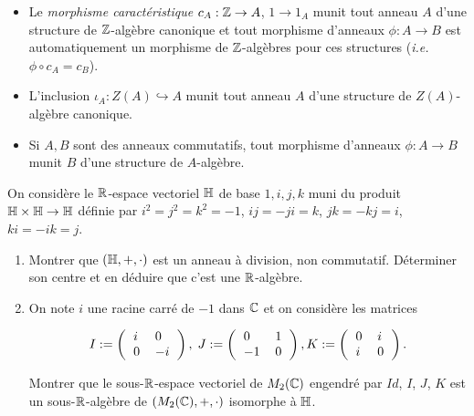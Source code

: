 \begin{exemples}
\begin{itemize}[leftmargin=* ,parsep=0cm,itemsep=0cm,topsep=0cm]
    \item Le \emph{morphisme caractéristique} $c_A:\mathbb{Z}\rightarrow A$, $1\rightarrow 1_A$ munit tout
        anneau $A$ d'une structure de $\mathbb{Z}$-algèbre canonique et tout morphisme
        d'anneaux $\phi:A\rightarrow B$ est automatiquement un morphisme de
        $\mathbb{Z}$-algèbres pour ces structures (\textit{i.e.} $\phi\circ c_A=c_B$).   
    \item L'inclusion $\iota_A: Z(A)\hookrightarrow  A $  munit tout anneau $A$
        d'une structure de $Z(A)$-algèbre canonique. 
    \item Si $A,B$ sont des anneaux commutatifs, tout morphisme d'anneaux
        $\phi:A\rightarrow B$ munit $B$ d'une structure de $A$-algèbre.
\end{itemize}
\end{exemples}

\begin{exercice}[Quaternions]
    On considère le $\mathbb{R}$-espace vectoriel $\mathbb{H}$ de base $1,i,j,k$ muni du produit
    $\mathbb{H}\times \mathbb{H}\rightarrow \mathbb{H}$ définie par $i^2=j^2=k^2=-1$, $ij=-ji=k$,
    $jk=-kj=i$, $ki=-ik=j$. 
    \begin{enumerate}
        \item Montrer que $(\mathbb{H},+,\cdot)$ est un anneau à division, non
            commutatif. Déterminer son centre   et en déduire que c'est  une
            $\mathbb{R}$-algèbre. 
        \item On note $i$ une racine carré de $-1$ dans $\mathbb{C}$ et on considère les matrices

            \[I:=\left(\begin{tabular}[c]{ll}
            $i$&$0$\\
            $0$&$-i$
            \end{tabular}\right),\; J:=\left(\begin{tabular}[c]{ll}
            $0$&$1$\\
            $-1$&$0$
            \end{tabular}\right),K:=\left(\begin{tabular}[c]{ll}
            $0$&$i$\\
            $i$&$0$
            \end{tabular}\right).\]

            Montrer que le sous-$\mathbb{R}$-espace vectoriel de $M_2(\mathbb{C})$ engendré par
            $Id$, $I$, $J$, $K$ est un sous-$\mathbb{R}$-algèbre de $(M_2(\mathbb{C}),+,\cdot)$
            isomorphe à $\mathbb{H}$.
     \end{enumerate}
\end{exercice}
 
